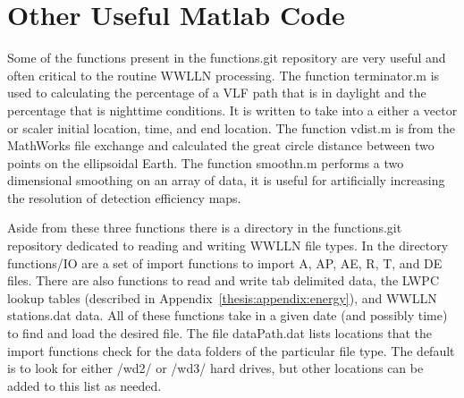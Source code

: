 
\section{Other Useful Matlab Code}

Some of the functions present in the functions.git repository are very useful and often critical to the routine WWLLN processing.
The function terminator.m is used to calculating the percentage of a VLF path that is in daylight and the percentage that is nighttime conditions.
It is written to take into a either a vector or scaler initial location, time, and end location.
The function vdist.m is from the MathWorks file exchange and calculated the great circle distance between two points on the ellipsoidal Earth.
The function smoothn.m performs a two dimensional smoothing on an array of data, it is useful for artificially increasing the resolution of detection efficiency maps.

Aside from these three functions there is a directory in the functions.git repository dedicated to reading and writing WWLLN file types.
In the directory functions/IO are a set of import functions to import A, AP, AE, R, T, and DE files.
There are also functions to read and write tab delimited data, the LWPC lookup tables (described in Appendix~\ref{thesis:appendix:energy}), and WWLLN stations.dat data.
All of these functions take in a given date (and possibly time) to find and load the desired file.
The file dataPath.dat lists locations that the import functions check for the data folders of the particular file type.
The default is to look for either /wd2/ or /wd3/ hard drives, but other locations can be added to this list as needed.
